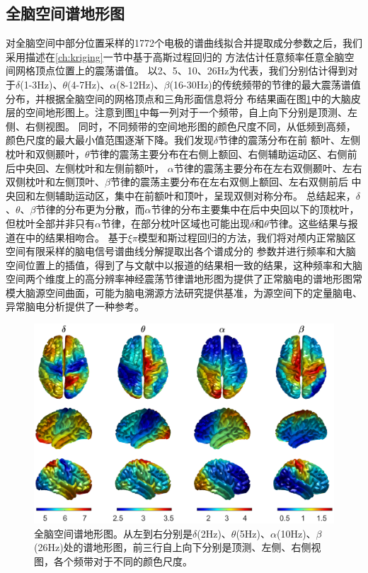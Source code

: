 \subsection{全脑空间谱地形图}
对全脑空间中部分位置采样的1772个电极的谱曲线拟合并提取成分参数之后，我们采用描述在\ref{ch:kriging}一节中基于高斯过程回归的
方法估计任意频率任意全脑空间网格顶点位置上的震荡谱值。 以2、5、10、26Hz为代表，我们分别估计得到对于$\delta$(1-3Hz)、$\theta$(4-7Hz)、$\alpha$(8-12Hz)、$\beta$(16-30Hz)的传统频带的节律的最大震荡谱值分布，并根据全脑空间的网格顶点和三角形面信息将分
布结果画在图\ref{map}中的大脑皮层的空间地形图上。注意到图\ref{map}中每一列对于一个频带，自上向下分别是顶测、左侧、右侧视图。 同时，不同频带的空间地形图的颜色尺度不同，从低频到高频，颜色尺度的最大最小值范围逐渐下降。我们发现$\delta$节律的震荡分布在前
额叶、左侧枕叶和双侧颞叶，$\theta$节律的震荡主要分布在右侧上额回、右侧辅助运动区、右侧前后中央回、左侧枕叶和左侧前额叶，
$\alpha$节律的震荡主要分布在左右双侧颞叶、左右双侧枕叶和左侧顶叶、$\beta$节律的震荡主要分布在左右双侧上额回、左右双侧前后
中央回和左侧辅助运动区，集中在前额叶和顶叶，呈现双侧对称分布。 总结起来，$\delta$、$\theta$、$\beta$节律的分布更为分散，而$\alpha$节律的分布主要集中在后中央回以下的顶枕叶，但枕叶全部并非只有$\alpha$节律，在部分枕叶区域也可能出现$\delta$和$\theta$节律。这些结果与报道在\cite{gastaut1949enregistrement,jasper1949electrocorticograms,sem1953depth,chatrian1960depth,sem1956electroencephalographic,perez1962electrographic,graf1984electrocorticography,frauscher2018atlas}中的结果相吻合。 基于$\xi\pi$模型和斯过程回归的方法，我们将对颅内正常脑区空间有限采样的脑电信号谱曲线分解提取出各个谱成分的
参数并进行频率和大脑空间位置上的插值，得到了与文献中以报道的结果相一致的结果，这种频率和大脑空间两个维度上的高分辨率神经震荡节律谱地形图为提供了正常脑电的谱地形图常模大脑源空间曲面，可能为脑电溯源方法研究提供基准，为源空间下的定量脑电、异常脑电分析提供了一种参考。

\begin{figure}
	\includegraphics[width=15cm]{pic/xipi/map.png}
	\caption{全脑空间谱地形图。从左到右分别是$\delta$(2Hz)、$\theta$(5Hz)、$\alpha$(10Hz)、$\beta$(26Hz)处的谱地形图，前三行自上向下分别是顶测、左侧、右侧视图，各个频带对于不同的颜色尺度。}
	\label{map}
\end{figure}

